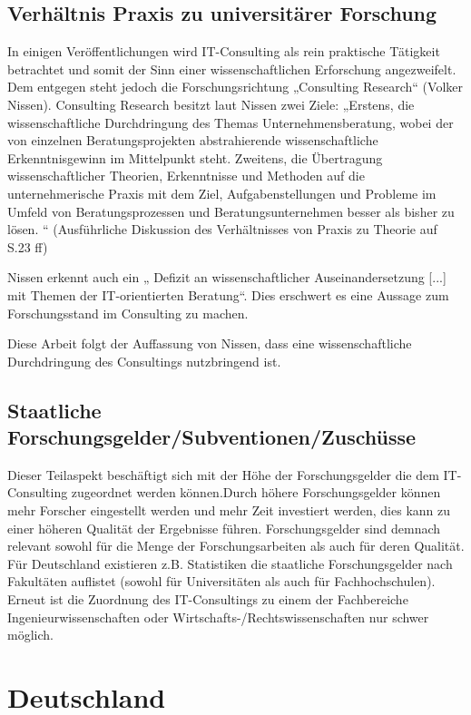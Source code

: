\subsection{Verhältnis Praxis zu universitärer Forschung}
In einigen Veröffentlichungen wird IT-Consulting als rein praktische Tätigkeit betrachtet und somit der Sinn einer wissenschaftlichen Erforschung angezweifelt. Dem entgegen steht jedoch die Forschungsrichtung „Consulting Research“ (Volker Nissen). Consulting Research besitzt laut Nissen zwei Ziele: „Erstens, die wissenschaftliche Durchdringung des Themas Unternehmensberatung, wobei der von einzelnen Beratungsprojekten abstrahierende wissenschaftliche Erkenntnisgewinn im Mittelpunkt steht. Zweitens, die Übertragung wissenschaftlicher Theorien, Erkenntnisse und Methoden auf die unternehmerische Praxis mit dem Ziel, Aufgabenstellungen und Probleme im Umfeld von Beratungsprozessen und Beratungsunternehmen besser als bisher zu lösen. “
(Ausführliche Diskussion des Verhältnisses von Praxis zu Theorie auf S.23 ff)

Nissen erkennt auch ein „ Defizit an wissenschaftlicher Auseinandersetzung [...] mit Themen der IT-orientierten Beratung“. Dies erschwert es eine Aussage zum Forschungsstand im Consulting zu machen.

Diese Arbeit folgt der Auffassung von Nissen, dass eine wissenschaftliche Durchdringung des Consultings nutzbringend ist.

\subsection{Staatliche Forschungsgelder/Subventionen/Zuschüsse}
Dieser Teilaspekt beschäftigt sich mit der Höhe der Forschungsgelder die dem IT-Consulting zugeordnet werden können.Durch höhere Forschungsgelder können mehr Forscher eingestellt werden und mehr Zeit investiert werden, dies kann zu einer höheren Qualität der Ergebnisse führen. Forschungsgelder sind demnach relevant sowohl für die Menge der Forschungsarbeiten als auch für deren Qualität.
Für Deutschland existieren z.B. Statistiken die staatliche Forschungsgelder nach Fakultäten auflistet (sowohl für Universitäten als auch für Fachhochschulen). Erneut ist die Zuordnung des IT-Consultings zu einem der Fachbereiche Ingenieurwissenschaften oder Wirtschafts-/Rechtswissenschaften nur schwer möglich.


\section{Deutschland}
